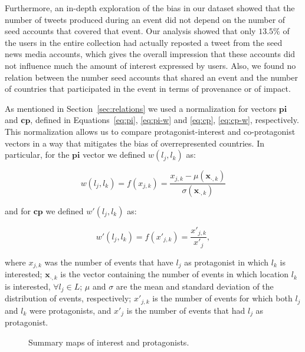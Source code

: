Furthermore, an in-depth exploration of the bias in our dataset showed that the
number of tweets produced during an event did not depend on the number of seed accounts that covered
that event. Our analysis showed that only $13.5\%$ of the users
in the entire collection had actually reposted a tweet from the seed news media
accounts, which gives the overall impression that these accounts did not
influence much the amount of interest expressed by users. Also,
we found no relation between the number seed accounts that shared an event
and the number of countries that participated in the
event in terms of provenance or of impact.

As mentioned in Section~\ref{sec:relations} we used a normalization for
vectors $\mathbf{pi}$ and $\mathbf{cp}$, defined in Equations~\ref{eq:pi}, \ref{eq:pi-w} and
\ref{eq:cp}, \ref{eq:cp-w}, respectively. This normalization allows us to compare
protagonist-interest and co-protagonist vectors in a way that mitigates the
bias of overrepresented countries. In particular, for
the $\mathbf{pi}$ vector we defined $w(l_j,l_k)$ as:

$$w(l_j, l_k) = f(x_{j,k})= \frac{x_{j,k} - \mu(\mathbf{x}_{\cdot,k})}{\sigma(\mathbf{x}_{\cdot,k})}$$

\noindent and for $\mathbf{cp}$ we defined $w'(l_j,l_k)$ as:

$$w'(l_j, l_k) = f(x'_{j,k})= \frac{x'_{j,k}}{x'_{j}},$$

\noindent where $x_{j,k}$ was the number of events that have $l_j$ as protagonist
 in which $l_k$ is interested; $\mathbf{x}_{\cdot,k}$ is the vector containing the number
of events in which location $l_k$ is interested, $\forall l_j \in L$;
$\mu$ and $\sigma$ are the mean and standard deviation of the distribution of events,
respectively; $x'_{j,k}$ is the number of events for which both
$l_j$ and $l_k$ were protagonists, and $x'_{j}$ is the number of events
that had $l_j$ as protagonist.

\begin{figure*}[t]
\centering
\caption{Summary maps of interest and protagonists.}\label{fig:maps}
\end{figure*}

